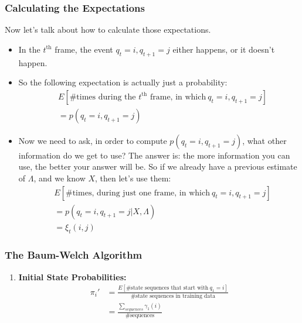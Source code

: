 \documentclass{beamer}
\begin{document}
\begin{frame}
  \frametitle{Calculating the Expectations}

  Now let's talk about how to calculate those expectations.
  \begin{itemize}
  \item In the $t^{\textrm{th}}$ frame, the event $q_{t}=i,q_{t+1}=j$ either
    happens, or it doesn't happen.
  \item So the following  expectation is actually just a  probability:
    \begin{align*}
      & E\left[\mbox{\# times during the $t^{\textrm{th}}$ frame, in which}~q_{t}=i,q_{t+1}=j\right] \\
      & = p(q_{t}=i,q_{t+1}=j)
    \end{align*}
  \item Now we need to ask, in order to compute $p(q_{t}=i,q_{t+1}=j)$,
    what other information do we get to use?  The answer is: the more
    information you can use, the better your answer will be.  So if we
    already have a previous estimate of $\Lambda$, and we know $X$, then let's
    use them:
    \begin{align*}
      & E\left[\mbox{\# times, during just one frame, in which}~q_{t}=i,q_{t+1}=j\right] \\
      & = p(q_{t}=i,q_{t+1}=j|X,\Lambda)\\
      &= \xi_t(i,j)
    \end{align*}
  \end{itemize}
\end{frame}

\begin{frame}
  \frametitle{The Baum-Welch Algorithm}

  \begin{enumerate}
  \item {\bf Initial State Probabilities:}
    \begin{align*}
      \pi_i'&=\frac{E\left[\mbox{\# state sequences that start with}~q_1=i\right]}{\mbox{\# state sequences in training data}}\\
      &=\frac{\sum_{sequences} \gamma_1(i)}{\mbox{\# sequences}}
    \end{align*}
  \end{enumerate}
\end{frame}
\end{document}
